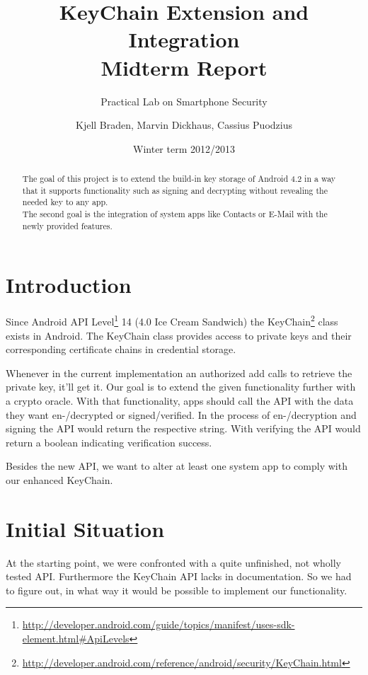\documentclass[a4paper,draft]{scrartcl}
\title{KeyChain Extension and Integration\\
	Midterm Report}
\subtitle{Practical Lab on Smartphone Security}
\author{Kjell Braden, Marvin Dickhaus, Cassius Puodzius}
\date{Winter term 2012/2013}
\begin{document}
\maketitle

\begin{abstract}
	The goal of this project is to extend the build-in key storage of Android 4.2 in a way that it supports functionality such as signing and decrypting without revealing the needed key to any app.\\
	The second goal is the integration of system apps like Contacts or E-Mail with the newly provided features.
\end{abstract}

\tableofcontents

\section{Introduction}
	Since Android API Level\footnote{\url{http://developer.android.com/guide/topics/manifest/uses-sdk-element.html\#ApiLevels}} 14 (4.0 Ice Cream Sandwich) the KeyChain\footnote{\url{http://developer.android.com/reference/android/security/KeyChain.html}} class exists in Android. The KeyChain class provides access to private keys and their corresponding certificate chains in credential storage.

	Whenever in the current implementation an authorized add calls to retrieve the private key, it'll get it. Our goal is to extend the given functionality further with a crypto oracle. With that functionality, apps should call the API with the data they want en-/decrypted or signed/verified. In the process of en-/decryption and signing the API would return the respective string. With verifying the API would return a boolean indicating verification success.

	Besides the new API, we want to alter at least one system app to comply with our enhanced KeyChain.

\section{Initial Situation}
	At the starting point, we were confronted with a quite unfinished, not wholly tested API. Furthermore the KeyChain API lacks in documentation. So we had to figure out, in what way it would be possible to implement our functionality.
\end{document}

